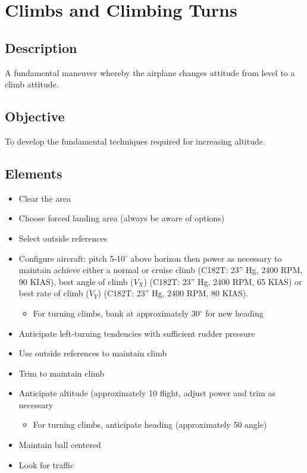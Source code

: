 \section{Climbs and Climbing Turns}

\subsection{Description}

A fundamental maneuver whereby the airplane changes attitude from level to a
climb attitude.

\subsection{Objective}

To develop the fundamental techniques required for increasing altitude.

\subsection{Elements}

\begin{itemize}
  \item Clear the area
  \item Choose forced landing area (always be aware of options) 
  \item Select outside references
  \item Configure aircraft: pitch 5-10$^\circ$ above horizon then power as necessary
    to maintain achieve either a normal or cruise climb (C182T: 23'' Hg, 2400
    RPM, 90 KIAS), best angle of climb ($V_X$) (C182T: 23'' Hg, 2400 RPM, 65
    KIAS) or best rate of climb ($V_Y$) (C182T: 23'' Hg, 2400 RPM, 80 KIAS). 
    \begin{itemize}
      \item For turning climbs, bank at approximately 30$^\circ$ for new
        heading
    \end{itemize}
  \item Anticipate left-turning tendencies with sufficient rudder pressure
  \item Use outside references to maintain climb
  \item Trim to maintain climb
  \item Anticipate altitude (approximately 10%
    flight, adjust power and trim as necessary
    \begin{itemize}
      \item For turning climbs, anticipate heading (approximately 50%
        angle)
    \end{itemize}
  \item Maintain ball centered
  \item Look for traffic
\end{itemize}

